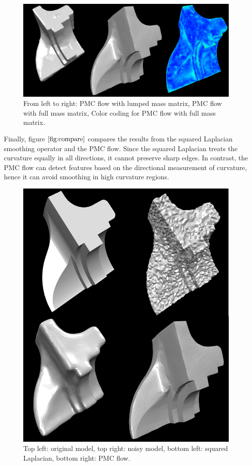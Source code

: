 \documentclass[11pt]{article}
\begin{document}
\begin{figure}[htb]
\centering
\includegraphics[width=\textwidth]{results.png}
\caption{From left to right: PMC flow with lumped mass matrix, PMC flow with full mass matrix, Color coding for PMC flow with full mass matrix.}
\label{fig:results}
\end{figure}

Finally, figure $\ref{fig:compare}$ compares the results from the squared Laplacian smoothing operator and the PMC flow. Since the squared Laplacian treats the curvature equally in all directions, it cannot preserve sharp edges. In contrast, the PMC flow can detect features based on the directional measurement of curvature, hence it can avoid smoothing in high curvature regions.

\begin{figure}[htb]
\centering
\includegraphics[width=\textwidth]{amc_laplacian.png}
\caption{Top left: original model, top right: noisy model, bottom left: squared Laplacian, bottom right: PMC flow.}
\label{fig:compare}
\end{figure}
\end{document}
